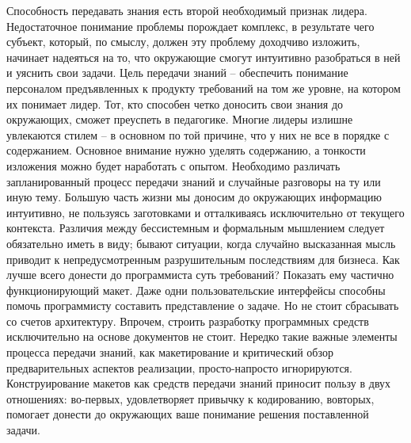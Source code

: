 \documentclass{../industrial-development}
\begin{document}
Способность передавать знания есть второй необходимый признак лидера. Недостаточное понимание проблемы порождает комплекс, в результате чего субъект, который, по смыслу, должен эту проблему доходчиво изложить, начинает надеяться на то, что окружающие смогут интуитивно разобраться в ней и уяснить свои задачи.
Цель передачи знаний – обеспечить понимание персоналом предъявленных к продукту требований на том же уровне, на котором их понимает лидер. 
Тот, кто способен четко доносить свои знания до окружающих, сможет преуспеть в педагогике.
Многие лидеры излишне увлекаются стилем – в основном по той причине, что у них не все в порядке с содержанием. Основное внимание нужно уделять содержанию, а тонкости изложения можно будет наработать с опытом. Необходимо различать запланированный процесс передачи знаний и случайные разговоры на ту или иную тему. Большую часть жизни мы доносим до окружающих информацию интуитивно, не пользуясь заготовками и отталкиваясь исключительно от текущего контекста. Различия между бессистемным и формальным мышлением следует обязательно иметь в виду; бывают ситуации, когда случайно высказанная мысль приводит к непредусмотренным разрушительным последствиям для бизнеса.
Как лучше всего донести до программиста суть требований? Показать ему частично функционирующий макет. Даже одни пользовательские интерфейсы способны помочь программисту составить представление о задаче. Но не стоит сбрасывать со счетов архитектуру. Впрочем, строить разработку программных средств исключительно на основе документов не стоит. Нередко такие важные элементы процесса передачи знаний, как макетирование и критический обзор предварительных аспектов реализации, просто-напросто игнорируются. Конструирование макетов как средств передачи знаний приносит пользу в двух отношениях: во-первых, удовлетворяет привычку к кодированию, вовторых, помогает донести до окружающих ваше понимание решения поставленной задачи.
\end{document}
